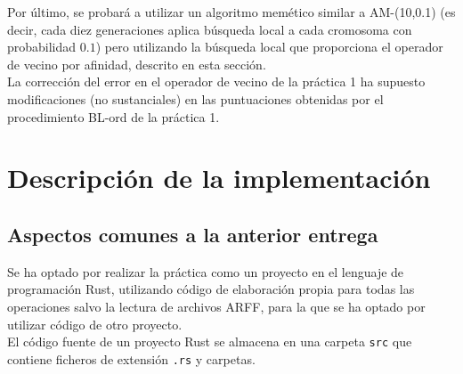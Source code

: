 \documentclass{article}
\begin{document}
Por último, se probará a utilizar un algoritmo memético similar a AM-(10,0.1) (es decir, cada diez generaciones aplica búsqueda local a cada cromosoma con probabilidad $0.1$) pero utilizando la búsqueda local que proporciona el operador de vecino por afinidad, descrito en esta sección. \\

La corrección del error en el operador de vecino de la práctica 1 ha supuesto modificaciones (no sustanciales) en las puntuaciones obtenidas por el procedimiento BL-ord de la práctica 1.

\section{Descripción de la implementación}

\subsection*{Aspectos comunes a la anterior entrega}

Se ha optado por realizar la práctica como un proyecto en el lenguaje de programación Rust, utilizando código de elaboración propia para todas las operaciones salvo la lectura de archivos ARFF, para la que se ha optado por utilizar código de otro proyecto. \\

El código fuente de un proyecto Rust se almacena en una carpeta \texttt{src} que contiene ficheros de extensión \texttt{.rs} y carpetas.
\end{document}
